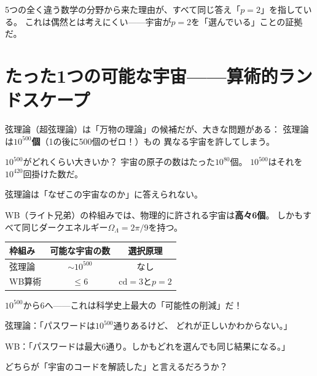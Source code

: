 \documentclass[12pt,a4paper]{article}
\begin{document}
\begin{funbox}
5つの全く違う数学の分野から来た理由が、すべて同じ答え「$p=2$」を指している。
これは偶然とは考えにくい——宇宙が$p=2$を「選んでいる」ことの証拠だ。
\end{funbox}

\section{たった1つの可能な宇宙——算術的ランドスケープ}

\begin{ideabox}[弦理論のランドスケープ問題]
弦理論（超弦理論）は「万物の理論」の候補だが、大きな問題がある：
弦理論は\textbf{$10^{500}$個}（1の後に500個のゼロ！）もの
異なる宇宙を許してしまう。

$10^{500}$がどれくらい大きいか？
宇宙の原子の数はたった$10^{80}$個。
$10^{500}$はそれを$10^{420}$回掛けた数だ。

弦理論は「なぜこの宇宙なのか」に答えられない。
\end{ideabox}

\begin{keybox}[算術的ランドスケープ：高々6個]
WB（ライト兄弟）の枠組みでは、物理的に許される宇宙は\textbf{高々6個}。
しかもすべて同じダークエネルギー$\Omega_\Lambda = 2\pi/9$を持つ。

\begin{center}
\begin{tabular}{lcc}
\toprule
\textbf{枠組み} & \textbf{可能な宇宙の数} & \textbf{選択原理} \\
\midrule
弦理論           & $\sim 10^{500}$        & なし \\
WB算術           & $\le 6$                & $\mathrm{cd}=3$と$p=2$ \\
\bottomrule
\end{tabular}
\end{center}

$10^{500}$から$6$へ——これは科学史上最大の「可能性の削減」だ！
\end{keybox}

\begin{analogybox}[パスワードのアナロジー]
弦理論：「パスワードは$10^{500}$通りあるけど、
どれが正しいかわからない。」

WB：「パスワードは最大6通り。しかもどれを選んでも同じ結果になる。」

どちらが「宇宙のコードを解読した」と言えるだろうか？
\end{analogybox}
\end{document}

